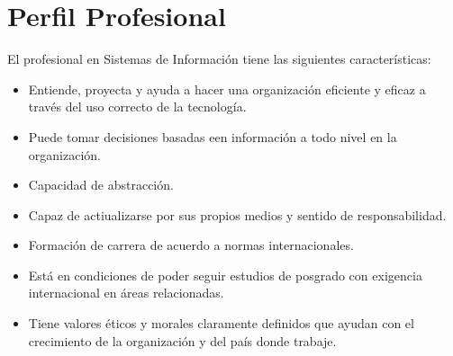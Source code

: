 \section{Perfil Profesional}\label{sec:professional-profile}
El profesional en Sistemas de Información tiene las siguientes características:

\begin{itemize}
\item Entiende, proyecta y ayuda a hacer una organización eficiente y eficaz a través del uso correcto de la tecnología.
\item Puede tomar decisiones basadas een información a todo nivel en la organización.
\item Capacidad de abstracción.
\item Capaz de actiualizarse por sus propios medios y sentido de responsabilidad.
\item Formación de carrera de acuerdo a normas internacionales.
\item Está en condiciones de poder seguir estudios de posgrado con exigencia internacional en áreas relacionadas.
\item Tiene valores éticos y morales claramente definidos que ayudan con el crecimiento de la organización y del país donde trabaje.
\end{itemize}